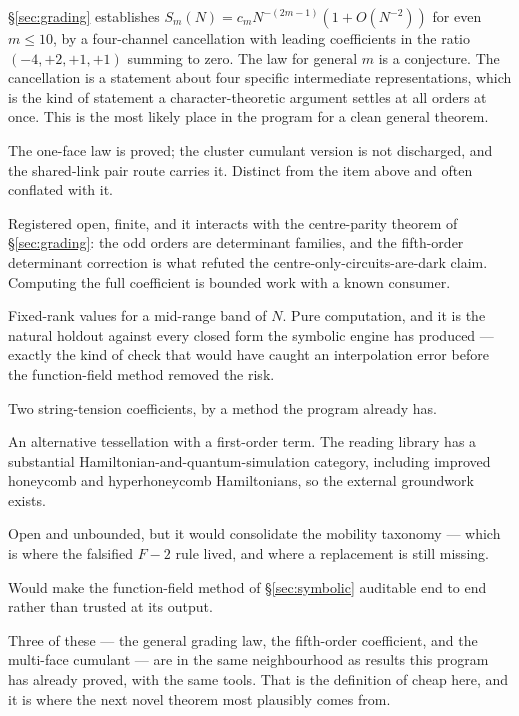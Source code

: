 \begin{description}[leftmargin=1.1em,style=nextline]
\item[The general grading law.] \S\ref{sec:grading} establishes
  $S_m(N) = c_m N^{-(2m-1)}(1+O(N^{-2}))$ for even $m \le 10$, by a
  four-channel cancellation with leading coefficients in the ratio
  $(-4,+2,+1,+1)$ summing to zero. The law for general $m$ is a
  conjecture. The cancellation is a statement about four specific
  intermediate representations, which is the kind of statement a
  character-theoretic argument settles at all orders at once. This is
  the most likely place in the program for a clean general theorem.
\item[The multi-face cumulant.] The one-face law is proved; the cluster
  cumulant version is not discharged, and the shared-link pair route
  carries it. Distinct from the item above and often conflated with it.
\item[The fifth-order pentagonal coefficient.] Registered open, finite,
  and it interacts with the centre-parity theorem of
  \S\ref{sec:grading}: the odd orders are determinant families, and the
  fifth-order determinant correction is what refuted the
  centre-only-circuits-are-dark claim. Computing the full coefficient
  is bounded work with a known consumer.
\item[The rank holdout ledger.] Fixed-rank values for a mid-range band
  of $N$. Pure computation, and it is the natural holdout against every
  closed form the symbolic engine has produced --- exactly the kind of
  check that would have caught an interpolation error before the
  function-field method removed the risk.
\item[Native torelon reruns.] Two string-tension coefficients, by a
  method the program already has.
\item[The hyperhoneycomb candidate.] An alternative tessellation with a
  first-order term. The reading library has a substantial
  Hamiltonian-and-quantum-simulation category, including improved
  honeycomb and hyperhoneycomb Hamiltonians, so the external groundwork
  exists.
\item[Classification of shortest physical temporal histories.] Open and
  unbounded, but it would consolidate the mobility taxonomy --- which
  is where the falsified $F{-}2$ rule lived, and where a replacement is
  still missing.
\item[The symbolic Gram transcript.] Would make the function-field
  method of \S\ref{sec:symbolic} auditable end to end rather than
  trusted at its output.
\end{description}

Three of these --- the general grading law, the fifth-order
coefficient, and the multi-face cumulant --- are in the same
neighbourhood as results this program has already proved, with the same
tools. That is the definition of cheap here, and it is where the next
novel theorem most plausibly comes from.
